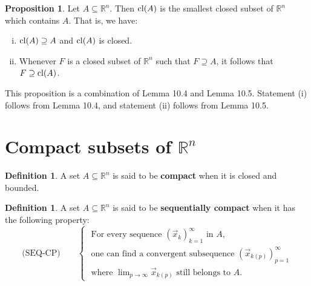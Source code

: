 \documentclass[11pt]{article}
\makeatletter
\theoremstyle{definition}
\newtheorem{defn}[thm]{Definition}
\newtheorem{prop}[thm]{Proposition}
\newcommand{\R}{\ensuremath{\mathbb{R}}}
\newenvironment{pf}[1][\proofname]{\par
  \pushQED{\qed}%
  \normalfont \topsep0\p@\relax
  \trivlist
  \item[\hskip\labelsep\itshape
  #1\@addpunct{.}]\ignorespaces
}{%
  \popQED\endtrivlist\@endpefalse
}
\makeatother
\begin{document}
\begin{prop}
Let $A \subseteq \R^n$. Then ${\rm cl}(A)$ is the smallest closed subset of $\R^n$ which contains $A$. That is, we have:\vspace{-1.5ex}
\begin{enumerate}[(i)]
\item ${\rm cl}(A) \supseteq A$ and ${\rm cl}(A)$ is closed.
\item Whenever $F$ is a closed subset of $\R^n$ such that $F \supseteq A$, it follows that $F \supseteq {\rm cl}(A)$.
\end{enumerate}
\end{prop}
\begin{pf}
This proposition is a combination of Lemma 10.4 and Lemma 10.5. Statement (i) follows from Lemma 10.4, and statement (ii) follows from Lemma 10.5.
\end{pf}

\newpage
\section{Compact subsets of $\R^n$}

\begin{defn}
A set $A \subseteq \R^n$ is said to be {\bf compact} when it is closed and bounded.
\end{defn}

\begin{defn}
A set $A \subseteq \R^n$ is said to be {\bf sequentially compact} when it has the following property:
\[ \text{(SEQ-CP)} \quad\quad \begin{cases} \text{ For every sequence $(\vec{x}_k)_{k=1}^\infty$ in $A$,} \\ \text{ one can find a convergent subsequence $(\vec{x}_{k(p)})_{p=1}^\infty$} \\ \text{ where $\lim\nolimits_{p\to\infty} \vec{x}_{k(p)}$ still belongs to $A$.} \end{cases} \]
\end{defn}
\end{document}
